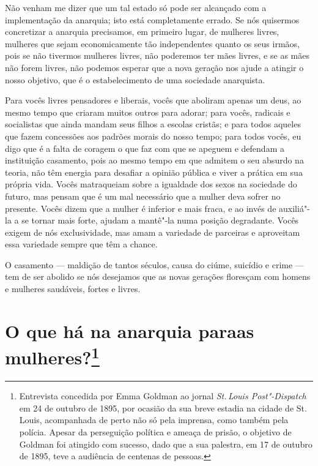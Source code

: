 Não venham me dizer que um tal estado só pode ser alcançado com a
implementação da anarquia; isto está completamente errado. Se nós
quisermos concretizar a anarquia precisamos, em primeiro lugar, de mulheres livres, mulheres que sejam economicamente tão
independentes quanto os seus irmãos, pois se não tivermos mulheres
livres, não poderemos ter mães livres, e se as mães não forem livres,
não podemos esperar que a nova geração nos ajude a atingir o nosso
objetivo, que é o estabelecimento de uma sociedade anarquista.

Para vocês livres pensadores e liberais, vocês que aboliram apenas um deus, ao mesmo tempo que criaram muitos outros para adorar; para vocês, radicais e
socialistas que ainda mandam seus filhos a escolas cristãs; e para
todos aqueles que fazem concessões aos padrões morais do nosso tempo;
para todos vocês, eu digo que é a falta de coragem o que faz com que
se apeguem e defendam a instituição casamento, pois ao mesmo tempo
em que admitem o seu absurdo na teoria, não têm energia para
desafiar a opinião pública e viver a prática em sua própria vida. Vocês
matraqueiam sobre a igualdade dos sexos na sociedade do futuro, mas\label{matraqueiam}
pensam que é um mal necessário que a mulher deva sofrer no presente.
Vocês dizem que a mulher é inferior e mais fraca, e ao invés de
auxiliá"-la a se tornar mais forte, ajudam a mantê"-la numa posição
degradante. Vocês exigem de nós exclusividade, mas amam a variedade de
parceiras e aproveitam essa variedade sempre que têm a chance.

O casamento --- maldição de tantos séculos, causa do ciúme, suicídio e
crime --- tem de ser abolido se nós desejamos que as novas gerações
floresçam com homens e mulheres saudáveis, fortes e livres.

\chapter[O que há na anarquia para as mulheres?]{O que há na anarquia para\break as mulheres?\footnote{Entrevista concedida por Emma Goldman
  ao jornal \textit{St.\,Louis Post"-Dispatch} em 24 de outubro de 1895, por
  ocasião da sua breve estadia na cidade de St.\,Louis, acompanhada de
  perto não só pela imprensa, como também pela polícia. Apesar da
  perseguição política e ameaça de prisão, o objetivo de Goldman foi
  atingido com sucesso, dado que a sua palestra, em 17 de outubro de
  1895, teve a audiência de centenas de pessoas.}}

